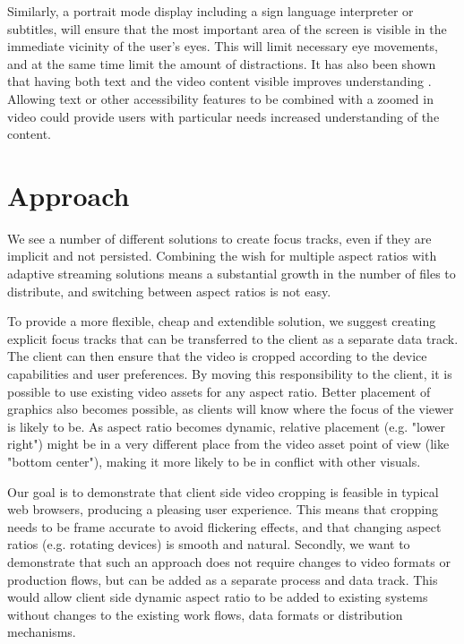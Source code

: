 \documentclass[sigconf, review=true]{acmart}
\begin{document}
Similarly, a portrait mode display including a sign language interpreter or
subtitles, will ensure that the most important area of the screen is visible
in the immediate vicinity of the user's eyes. This will limit necessary eye
movements, and at the same time limit the amount of distractions. It has also
been shown that having both text and the video content visible improves
understanding \cite{eyetracking}. Allowing text or other accessibility
features to be combined with a zoomed in video could provide users with
particular needs increased understanding of the content.


\section{Approach}

We see a number of different solutions to create focus tracks, even if they
are implicit and not persisted. Combining the wish for multiple aspect ratios
with adaptive streaming solutions means a substantial growth in the number of
files to distribute, and switching between aspect ratios is not easy.

To provide a more flexible, cheap and extendible solution, we suggest creating
explicit focus tracks that can be transferred to the client as a separate
data track. The client can then ensure that the video is cropped according to
the device capabilities and user preferences. By moving this responsibility
to the client, it is possible to use existing video assets for any aspect
ratio. Better placement of graphics also becomes possible, as clients will
know where the focus of the viewer is likely to be. As aspect ratio becomes
dynamic, relative placement (e.g. "lower right") might be in a very different
place from the video asset point of view (like "bottom center"), making it
more likely to be in conflict with other visuals. 

Our goal is to demonstrate that client side video cropping is feasible in
typical web browsers, producing a pleasing user experience. This means that
cropping needs to be frame accurate to avoid flickering effects, and that
changing aspect ratios (e.g. rotating devices) is smooth and natural.
Secondly, we want to demonstrate that such an approach does not require
changes to video formats or production flows, but can be added as a separate
process and data track. This would allow client side dynamic aspect ratio to
be added to existing systems without changes to the existing work flows, data
formats or distribution mechanisms.
\end{document}
